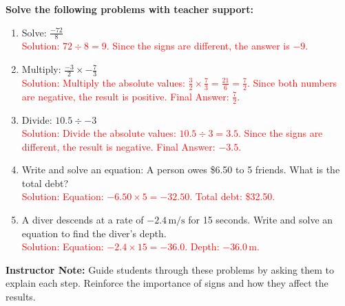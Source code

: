 \documentclass[11pt]{article}
\begin{document}
\begin{tcolorbox}[colframe=black!60, colback=white, 
coltitle=black, colbacktitle=black!15, fonttitle=\bfseries\Large, 
title=Guided Practice, halign title=center, left=10pt, right=10pt, top=10pt, bottom=15pt]
\textbf{Solve the following problems with teacher support:}
\begin{enumerate}[itemsep=1em]
    \item Solve: \( \frac{-72}{8} \) \\
    \textcolor{red}{Solution: \( 72 \div 8 = 9 \). Since the signs are different, the answer is \( -9 \).}
    \item Multiply: \( \frac{-3}{2} \times -\frac{7}{3} \) \\
    \textcolor{red}{Solution: Multiply the absolute values: \( \frac{3}{2} \times \frac{7}{3} = \frac{21}{6} = \frac{7}{2} \). Since both numbers are negative, the result is positive. Final Answer: \( \frac{7}{2} \).}
    \item Divide: \( 10.5 \div -3 \) \\
    \textcolor{red}{Solution: Divide the absolute values: \( 10.5 \div 3 = 3.5 \). Since the signs are different, the result is negative. Final Answer: \( -3.5 \).}
    \item Write and solve an equation: A person owes \$6.50 to 5 friends. What is the total debt? \\
    \textcolor{red}{Solution: Equation: \( -6.50 \times 5 = -32.50 \). Total debt: \$32.50.}
    \item A diver descends at a rate of \( -2.4 \, \text{m/s} \) for 15 seconds. Write and solve an equation to find the diver’s depth. \\
    \textcolor{red}{Solution: Equation: \( -2.4 \times 15 = -36.0 \). Depth: \( -36.0 \, \text{m} \).}
\end{enumerate}

{\color{blue} \textbf{Instructor Note:} Guide students through these problems by asking them to explain each step. Reinforce the importance of signs and how they affect the results.}
\end{tcolorbox}

\vspace{1em}
\end{document}
